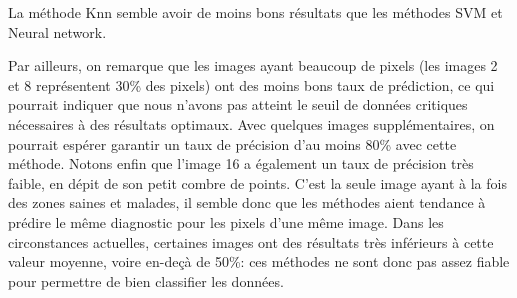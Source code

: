 \documentclass[a4paper,10pt]{report}
\begin{document}
La méthode Knn semble avoir de moins bons résultats que les méthodes SVM et Neural network. 

Par ailleurs, on remarque que les images ayant beaucoup de pixels (les images 2 et 8 représentent 30\% des pixels) ont des moins bons taux de prédiction, ce qui pourrait indiquer que nous n'avons pas atteint le seuil de données critiques nécessaires à des résultats optimaux. Avec quelques images supplémentaires, on pourrait espérer garantir un taux de précision d'au moins 80\% avec cette méthode. 
Notons enfin que l'image 16 a également un taux de précision très faible, en dépit de son petit combre de points. C'est la seule image ayant à la fois des zones saines et malades, il semble donc que les méthodes aient tendance à prédire le même diagnostic pour les pixels d'une même image.
Dans les circonstances actuelles, certaines images ont des résultats très inférieurs à cette valeur moyenne, voire en-deçà de 50\%: ces méthodes ne sont donc pas assez fiable pour permettre de bien classifier les données.

\tableofcontents


\listoffigures
\listoftables
\printindex
\end{document}
